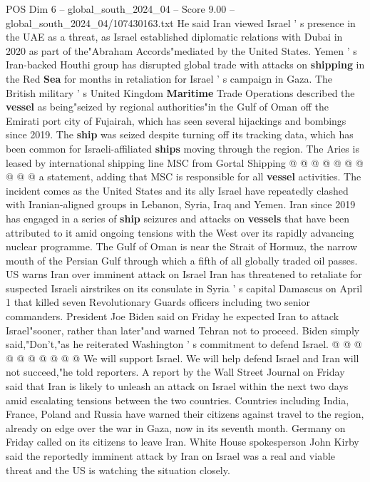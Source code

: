 \begin{textsample}{POS Dim 6 – global\_south\_2024\_04 – Score 9.00 – global\_south\_2024\_04/107430163.txt}
He said Iran viewed Israel ' s presence in the UAE as a threat, as Israel established diplomatic relations with Dubai in 2020 as part of the"Abraham Accords"mediated by the United States.
Yemen ' s Iran-backed Houthi group has disrupted global trade with attacks on \textbf{shipping} in the Red \textbf{Sea} for months in retaliation for Israel ' s campaign in Gaza.
The British military ' s United Kingdom \textbf{Maritime} Trade Operations described the \textbf{vessel} as being"seized by regional authorities"in the Gulf of Oman off the Emirati port city of Fujairah, which has seen several hijackings and bombings since 2019.
The \textbf{ship} was seized despite turning off its tracking data, which has been common for Israeli-affiliated \textbf{ships} moving through the region.
The Aries is leased by international shipping line MSC from Gortal Shipping @ @ @ @ @ @ @ @ @ @ a statement, adding that MSC is responsible for all \textbf{vessel} activities.
The incident comes as the United States and its ally Israel have repeatedly clashed with Iranian-aligned groups in Lebanon, Syria, Iraq and Yemen.
Iran since 2019 has engaged in a series of \textbf{ship} seizures and attacks on \textbf{vessels} that have been attributed to it amid ongoing tensions with the West over its rapidly advancing nuclear programme.
The Gulf of Oman is near the Strait of Hormuz, the narrow mouth of the Persian Gulf through which a fifth of all globally traded oil passes.
US warns Iran over imminent attack on Israel Iran has threatened to retaliate for suspected Israeli airstrikes on its consulate in Syria ' s capital Damascus on April 1 that killed seven Revolutionary Guards officers including two senior commanders.
President Joe Biden said on Friday he expected Iran to attack Israel"sooner, rather than later"and warned Tehran not to proceed.
Biden simply said,"Don't,"as he reiterated Washington ' s commitment to defend Israel. @ @ @ @ @ @ @ @ @ @ We will support Israel.
We will help defend Israel and Iran will not succeed,"he told reporters.
A report by the Wall Street Journal on Friday said that Iran is likely to unleash an attack on Israel within the next two days amid escalating tensions between the two countries.
Countries including India, France, Poland and Russia have warned their citizens against travel to the region, already on edge over the war in Gaza, now in its seventh month.
Germany on Friday called on its citizens to leave Iran.
White House spokesperson John Kirby said the reportedly imminent attack by Iran on Israel was a real and viable threat and the US is watching the situation closely.

\end{textsample}
